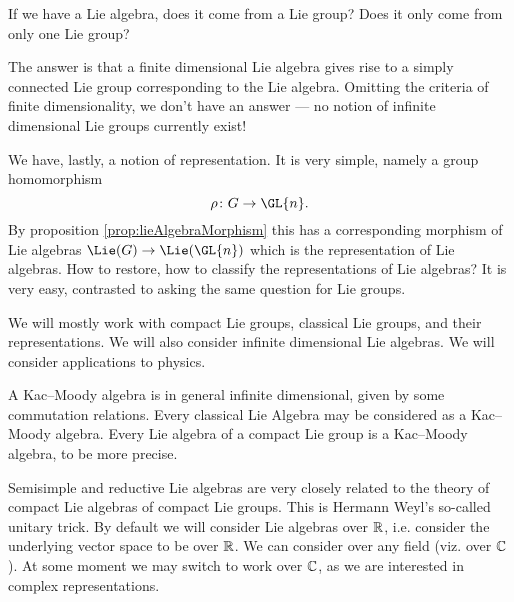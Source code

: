 \begin{quest}
If we have a Lie algebra, does it come from a Lie group? Does it
only come from only one Lie group?
\end{quest}
The answer is that a finite dimensional Lie algebra gives rise to
a simply connected Lie group corresponding to the Lie
algebra. Omitting the criteria of finite dimensionality, we don't
have an answer --- no notion of infinite dimensional Lie groups
currently exist!

We have, lastly, a notion of representation. It is very simple,
namely a group homomorphism
\begin{equation}
\rho\colon G\to\GL{n}.
\end{equation}
By proposition \ref{prop:lieAlgebraMorphism} this has a
corresponding  morphism of Lie algebras $\Lie(G)\to\Lie(\GL{n})$
which is the representation of Lie algebras. How to restore, how
to classify the representations of Lie algebras? It is very easy,
contrasted to asking the same question for Lie groups.

We will mostly work with compact Lie groups, classical Lie
groups, and their representations. We will also consider infinite
dimensional Lie algebras. We will consider applications to
physics.

A Kac--Moody algebra is in general infinite dimensional, given by
some commutation relations. Every classical Lie Algebra may be
considered as a Kac--Moody algebra. Every Lie algebra of a compact
Lie group is a Kac--Moody algebra, to be more precise.

Semisimple and reductive Lie algebras are very closely related to
the theory of compact Lie algebras of compact Lie groups. This is
Hermann Weyl's so-called unitary trick. By default we will
consider Lie algebras over $\Bbb{R}$, i.e. consider the
underlying vector space to be over $\Bbb{R}$. We can consider
over any field (viz. over $\Bbb{C}$). At some moment we may
switch to work over $\Bbb{C}$, as we are interested in complex
representations.
